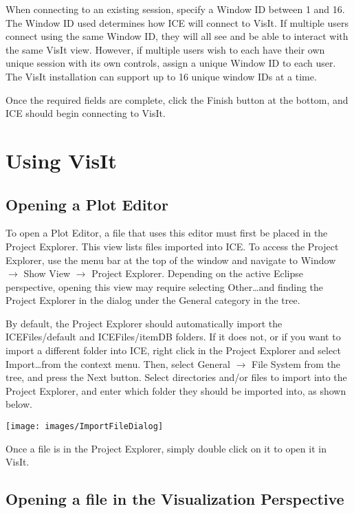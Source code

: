 When connecting to an existing session, specify a Window ID between 1 and 16.
The Window ID used determines how ICE will connect to VisIt. If multiple users
connect using the same Window ID, they will all see and be able to interact with
the same VisIt view. However, if multiple users wish to each have their own
unique session with its own controls, assign a unique Window ID to each user.
The VisIt installation can support up to 16 unique window IDs at a time.

Once the required fields are complete, click the Finish button at the bottom,
and ICE should begin connecting to VisIt.

\section{Using VisIt}

\subsection{Opening a Plot Editor} 

To open a Plot Editor, a file that uses this editor must first be placed in the
Project Explorer. This view lists files imported into ICE. To access the Project
Explorer, use the menu bar at the top of the window and navigate to Window
$\rightarrow$ Show View $\rightarrow$ Project Explorer. Depending on the active
Eclipse perspective, opening this view may require selecting Other\ldots and
finding the Project Explorer in the dialog under the General category in the
tree.

By default, the Project Explorer should automatically import the
ICEFiles/default and ICEFiles/itemDB folders. If it does not, or if you want to
import a different folder into ICE, right click in the Project Explorer and
select Import\ldots from the context menu. Then, select General $\rightarrow$
File System from the tree, and press the Next button. Select directories and/or
files to import into the Project Explorer, and enter which folder they should
be imported into, as shown below.

\begin{center}
\texttt{[image: images/ImportFileDialog]}
\end{center}

Once a file is in the Project Explorer, simply double click on it to open it in
VisIt.

\subsection{Opening a file in the Visualization Perspective}

